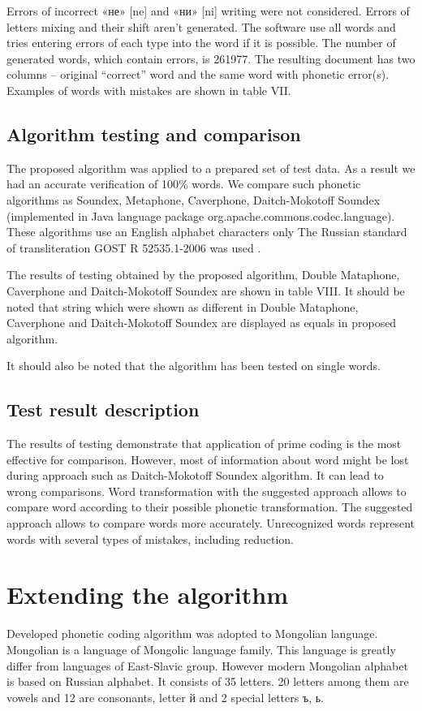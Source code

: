 \documentclass[conference,a4paper]{IEEEtran}
\begin{document}
Errors of incorrect «не» [ne] and «ни» [ni] writing were not considered. Errors of letters mixing and their shift aren't generated.
The software use all words and tries entering errors of each type into the word if it is possible. The number of generated words, which contain errors, is 261977.
The resulting document has two columns – original “correct” word and the same word with phonetic error(s). Examples of words with mistakes are shown in table VII.

\subsection{Algorithm testing and comparison}
The proposed algorithm was applied to a prepared set of test data. As a result we had an accurate verification of 100\% words.
We compare such phonetic algorithms as Soundex, Metaphone, Caverphone, Daitch-Mokotoff Soundex (implemented in Java language package org.apache.commons.codec.language). These algorithms use an English alphabet characters only The Russian standard of transliteration GOST R 52535.1-2006 was used \cite{GOST-2006}.

The results of testing obtained by the proposed algorithm, Double Mataphone, Caverphone and Daitch-Mokotoff Soundex  are shown in table VIII. It should be noted that string which were shown as different in Double Mataphone, Caverphone and Daitch-Mokotoff Soundex are  displayed as equals in proposed algorithm. 

It should also be noted that the algorithm has been tested on single words.

\subsection{Test result description}
The results of testing demonstrate that application of prime coding is the most effective for comparison. However, most of information about word might be lost during approach such as Daitch-Mokotoff Soundex  algorithm. It can lead to wrong comparisons. Word transformation with the suggested approach allows to compare word according to their possible phonetic transformation. The suggested approach allows to compare words more accurately. Unrecognized words represent words with several types of mistakes, including reduction.

\section{Extending the algorithm}
Developed phonetic coding algorithm was adopted to Mongolian language. Mongolian is a language of Mongolic language family. This language is greatly differ from languages of East-Slavic group. However modern Mongolian alphabet is based on Russian alphabet. It consists of 35 letters. 20 letters among them are vowels and 12 are consonants, letter й and 2 special letters ъ, ь.
\end{document}
